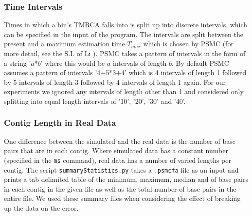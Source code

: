 \documentclass[11pt,a4paper]{article}
\begin{document}
\subsubsection{Time Intervals}
Times in which a bin's TMRCA falls into is split up into discrete intervals, which can be specified in the input of the program. The intervals are split between the present and a maximum estimation time $T_{max}$ which is chosen by PSMC (for more detail, see the S.I. of Li \cite{li2011inference}). PSMC takes a pattern of intervals in the form of a string '$a$*$b$' where this would be $a$ intervals of length $b$. By default PSMC assumes a pattern of intervals '4+5*3+4' which is 4 intervals of length 1 followed by 5 intervals of length 3 followed by 4 intervals of length 1 again. For our experiments we ignored any intervals of length other than 1 and considered only splitting into equal length intervals of '10', '20', '30' and '40'.



\subsubsection{Contig Length in Real Data}\label{contigLength}
One difference between the simulated and the real data is the number of base pairs that are in each contig. Where simulated data has a constant number (specified in the \verb|ms| command), real data has a number of varied lengths per contig. The script \verb|summaryStatistics.py| takes a \verb|.psmcfa| file as an input and prints a tab delimited table of the minimum, maximum, median and of base pairs in each contig in the given file as well as the total number of base pairs in the entire file. We used these summary files when considering the effect of breaking up the data on the error.
\end{document}
